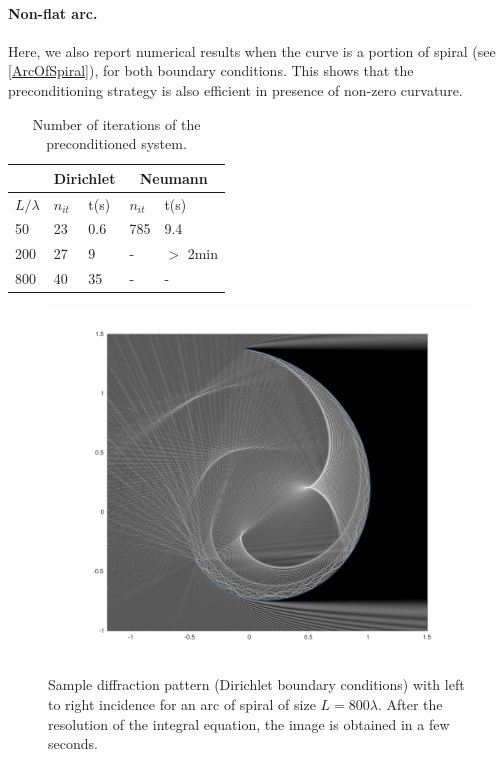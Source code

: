 \documentclass[a4paper]{article}
\begin{document}
\paragraph{Non-flat arc.} Here, we also report numerical results when the curve is a portion of spiral (see \autoref{ArcOfSpiral}), for both boundary conditions. This shows that the preconditioning strategy is also efficient in presence of non-zero curvature. 
\begin{table}[H]
	\begin{center}
		\begin{tabular}{|| m{4em} | m{4em} | m{4em} | m{4em} | m{4em}||} 
			\hline
			\multicolumn{1}{||c|}{ }&
			\multicolumn{2}{c|}{Dirichlet}&\multicolumn{2}{c||}{Neumann}\\
			\hline
			$L/\lambda$ & $n_{it}$& t(s) & $n_{it}$ & t(s)\\
			\hline\hline
			50 & 23 & 0.6 & 785 & 9.4\\
			\hline
			200 & 27 & 9 & - &  $>$ 2min\\
			\hline
			800 & 40 & 35 & - & -\\
			\hline
		\end{tabular}
	\end{center}
	\caption{Number of iterations of the preconditioned system. }
	\label{TableNitTimeHlemholtzDirSpiral}
\end{table}
\vspace{-1cm}
\begin{figure}[H]
	\centering
	\includegraphics[width=\linewidth]{../../figs/arcOfSpiral800_3}
	\vspace{-1.2cm}
	\caption{Sample diffraction pattern (Dirichlet boundary conditions) with left to right incidence for an arc of spiral of size $L = 800 \lambda$. After the resolution of the integral equation, the image is obtained in a few seconds.}
	\label{ArcOfSpiral}
\end{figure}
\end{document}
